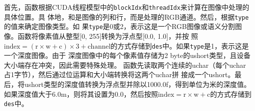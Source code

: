 \par 首先，函数根据CUDA线程模型中的\texttt{blockIdx}和\texttt{threadIdx}来计算在图像中处理的具体位置。具
体地，和是图像的列和行，而是处理的RGB通道。然后，根据\texttt{type}的值来确定图像类型。如
果\texttt{type}是0或2，表示这是一个RGB图像或语义分割图像。函数将像素值从整型[0, 255]转换为浮点型[0.0, 1.0]，并按
照$\text{index} = (\text{r} \times \text{w} + \text{c}) \times 3 + \text{channel}$的方式存储到\texttt{des}中。如果\texttt{type}是1，表示这是一个深度图像。由于
深度图像中的每个像素值存储为2 byte的ushort类型，且设备大小端存在冲突，因此需要特殊处理。
函数先读取两个连续的uchar（每个uchar占1字节），然后通过位运算和大小端转换将这两个uchar拼
接成一个ushort。最后，将ushort类型的深度值转换为浮点型并除以1000.0f，得到单位为米的深度值。
如果深度值大于6.0m，则将其设置为0.0，然后按照$\text{index} = \text{r} \times \text{w} + \text{c}$的方式存储到\texttt{des}中。